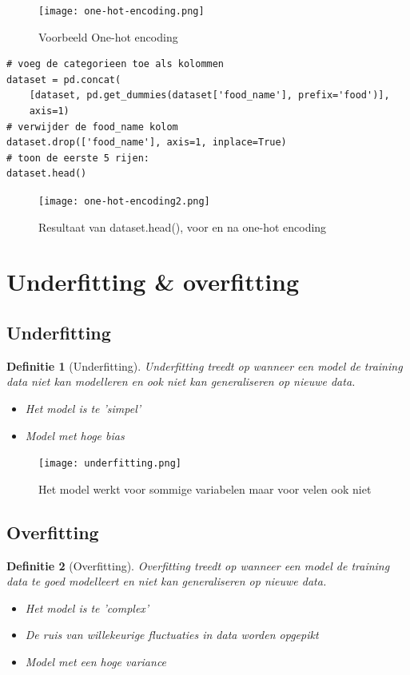 \documentclass{article}
\newtheorem{theorem}{Definitie}[section]
\begin{document}
\begin{figure}[H]
    \centering
    \texttt{[image: one-hot-encoding.png]}
    \caption{Voorbeeld One-hot encoding}
\end{figure}

\begin{verbatim}
# voeg de categorieen toe als kolommen
dataset = pd.concat(
    [dataset, pd.get_dummies(dataset['food_name'], prefix='food')], 
    axis=1)
# verwijder de food_name kolom
dataset.drop(['food_name'], axis=1, inplace=True)
# toon de eerste 5 rijen:
dataset.head()
\end{verbatim}

\begin{figure}[H]
    \centering
    \texttt{[image: one-hot-encoding2.png]}
    \caption{Resultaat van dataset.head(), voor en na one-hot encoding}
\end{figure}

\section{Underfitting \& overfitting}

\subsection{Underfitting}

\begin{theorem}[Underfitting]
Underfitting treedt op wanneer een model de training data niet kan modelleren 
en ook niet kan generaliseren op nieuwe data.

\begin{itemize}
    \item Het model is te 'simpel'
    \item Model met hoge bias
\end{itemize}
\end{theorem}

\begin{figure}[H]
    \centering
    \texttt{[image: underfitting.png]}
    \caption{Het model werkt voor sommige variabelen maar voor velen ook niet}
\end{figure}

\subsection{Overfitting}

\begin{theorem}[Overfitting]
Overfitting treedt op wanneer een model de training data te goed modelleert en niet kan
    generaliseren op nieuwe data.  

\begin{itemize}
    \item Het model is te 'complex'
    \item De ruis van willekeurige fluctuaties in data worden opgepikt
    \item Model met een hoge variance
\end{itemize}
\end{theorem}
\end{document}
